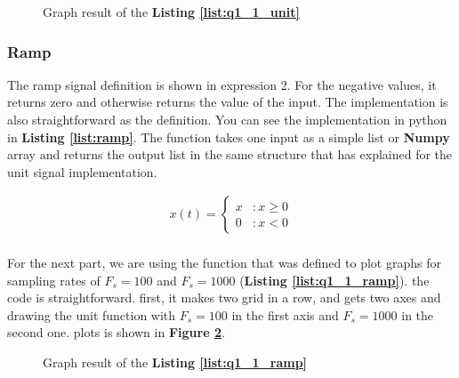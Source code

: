 
\begin{figure}[H]
  \scalebox{0.6}{}
  \caption{Graph result of the \textbf{Listing \ref{list:q1_1_unit}}}
  \label{fig:Q1-1-unit}
\end{figure}

\subsubsection{Ramp}
The ramp signal definition is shown in expression
 2. For the negative values, it returns zero and otherwise 
 returns the value of the input. The implementation is also 
 straightforward as the definition. You can see the 
 implementation in python in \textbf{Listing \ref{list:ramp}}. 
 The function takes one input as a simple list or 
 \textbf{Numpy} array and returns the output list in the same 
 structure that has explained for the unit signal implementation.   

\begin{align}
  x(t) = \begin{cases}
   x &: x\geq 0\\
   0 &: x< 0\end{cases}
 \end{align}

\paragraph{}For the next part, we are using the function that was defined to 
plot graphs for sampling rates of  $F_s=100$ and 
$F_s=1000$ (\textbf{Listing \ref{list:q1_1_ramp}}). the code is 
straightforward. first, it makes two grid in a row, and gets 
two axes and drawing the unit function with $F_s=100$ in the 
first axis and $F_s=1000$ in the second one. plots is shown in \textbf{Figure \ref{fig:Q1-1-ramp}}.

\begin{figure}[H]
  \scalebox{0.6}{}
  \caption{Graph result of the \textbf{Listing \ref{list:q1_1_ramp}}}
  \label{fig:Q1-1-ramp}
\end{figure}

